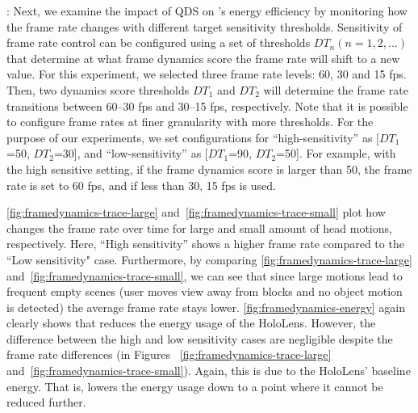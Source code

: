 

:
%
Next, we examine the impact of QDS on {\myit}'s energy efficiency by monitoring
how the frame rate changes with different target sensitivity thresholds.
%
Sensitivity of frame rate control can be configured using a set of thresholds 
$DT_n (n=1,2,...)$ that determine at what frame dynamics score the frame rate
will shift to a new value.
%
For this experiment, we selected three frame rate levels: 60, 30 and 15 fps.
%
Then, two dynamics score thresholds $DT_1$ and $DT_2$ will determine the frame
rate transitions between 60--30 fps and 30--15 fps, respectively.
%
Note that it is possible to configure frame rates at finer granularity with
more thresholds.
%
For the purpose of our experiments, we set configurations for
``high-sensitivity'' as [$DT_1$=50, $DT_2$=30], and 
``low-sensitivity'' as [$DT_1$=90, $DT_2$=50].
%
For example, with the high sensitive setting, if the frame dynamics score is 
larger than 50, the frame rate is set to 60 fps, and if less than 30, 15 fps is used.
%
%



\figs\ref{fig:framedynamics-trace-large} and~\ref{fig:framedynamics-trace-small}
plot how {\myit} changes the frame rate over time for large and small amount of 
head motions, respectively.
%
Here, ``High sensitivity'' {\myit} shows a higher frame rate compared to the
``Low sensitivity" case.
%
Furthermore, by comparing \figs\ref{fig:framedynamics-trace-large} 
and~\ref{fig:framedynamics-trace-small}, we can see that since large motions
lead to frequent empty scenes (user moves view away from blocks and
no object motion is detected) the average frame rate stays lower.
%
\fig\ref{fig:framedynamics-energy} again clearly shows that {\myit} reduces 
the energy usage of the HoloLens.
%
However, the difference between the high and low sensitivity cases are negligible
despite the frame rate differences 
(in Figures ~\ref{fig:framedynamics-trace-large} and~\ref{fig:framedynamics-trace-small}).
%
Again, this is due to the HoloLens' baseline energy. That is, {\myit} lowers 
the energy usage down to a point where it cannot be reduced further.


